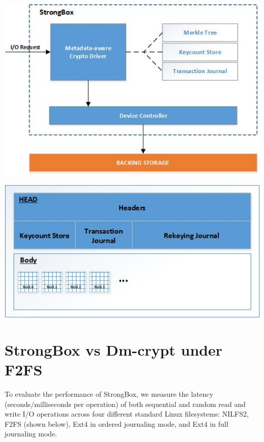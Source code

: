 \documentclass[a0,portrait]{a0poster}
\newcommand{\PAD}{\vskip 0.75cm}
\begin{document}
\begin{multicols}{2}
\begin{minipage}{0.6\columnwidth}
\PAD 
\centering
\includegraphics{overview}
\label{fig:overview}
\PAD 
\end{minipage}
\begin{minipage}{0.4\columnwidth}
\PAD 
\centering
\includegraphics{backstore}
\label{fig:backstore}
\PAD 
\end{minipage}

\section*{StrongBox vs Dm-crypt under F2FS}

To evaluate the performance of StrongBox, we measure the latency
(seconds/milliseconds per operation) of both sequential and random read and
write I/O operations across four different standard Linux filesystems: NILFS2,
F2FS (shown below), Ext4 in ordered journaling mode, and Ext4 in full journaling mode.


\end{multicols}
\end{document}
